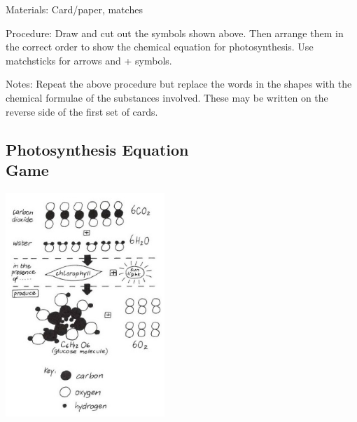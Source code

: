 \begin{multicols}{2}
\begin{description*}
\item[Materials:]{Card/paper, matches}
\item[Procedure:]{Draw and cut out the symbols shown above. Then arrange them in the correct order to
show the chemical equation for photosynthesis. Use matchsticks for arrows and + symbols.}
\item[Notes:]{Repeat the above procedure but replace the words in the shapes with the chemical
formulae of the substances involved. These may be written on the reverse side of the first set
of cards.}
\end{description*}

\subsection[Photosynthesis Equation Game]{Photosynthesis Equation \hfill \\ Game} %

\begin{center}
\includegraphics[width=0.45\textwidth]{./img/vso/photo-game.jpg}
\end{center}


\end{multicols}
